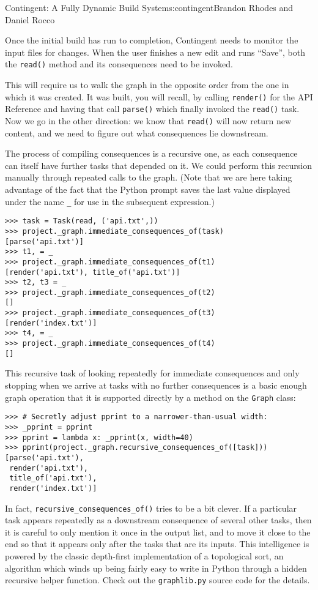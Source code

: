 \begin{aosachapter}{Contingent: A Fully Dynamic Build System}{s:contingent}{Brandon Rhodes and Daniel Rocco}
\label{chasing-consequences}

Once the initial build has run to completion, Contingent needs to
monitor the input files for changes. When the user finishes a new edit
and runs ``Save'', both the \texttt{read()} method and its consequences
need to be invoked.

This will require us to walk the graph in the opposite order from the
one in which it was created. It was built, you will recall, by calling
\texttt{render()} for the API Reference and having that call
\texttt{parse()} which finally invoked the \texttt{read()} task. Now we
go in the other direction: we know that \texttt{read()} will now return
new content, and we need to figure out what consequences lie downstream.

The process of compiling consequences is a recursive one, as each
consequence can itself have further tasks that depended on it. We could
perform this recursion manually through repeated calls to the graph.
(Note that we are here taking advantage of the fact that the Python
prompt saves the last value displayed under the name \texttt{\_} for use
in the subsequent expression.)

\begin{verbatim}
>>> task = Task(read, ('api.txt',))
>>> project._graph.immediate_consequences_of(task)
[parse('api.txt')]
>>> t1, = _
>>> project._graph.immediate_consequences_of(t1)
[render('api.txt'), title_of('api.txt')]
>>> t2, t3 = _
>>> project._graph.immediate_consequences_of(t2)
[]
>>> project._graph.immediate_consequences_of(t3)
[render('index.txt')]
>>> t4, = _
>>> project._graph.immediate_consequences_of(t4)
[]
\end{verbatim}

This recursive task of looking repeatedly for immediate consequences and
only stopping when we arrive at tasks with no further consequences is a
basic enough graph operation that it is supported directly by a method
on the \texttt{Graph} class:

\begin{verbatim}
>>> # Secretly adjust pprint to a narrower-than-usual width:
>>> _pprint = pprint
>>> pprint = lambda x: _pprint(x, width=40)
>>> pprint(project._graph.recursive_consequences_of([task]))
[parse('api.txt'),
 render('api.txt'),
 title_of('api.txt'),
 render('index.txt')]
\end{verbatim}

In fact, \texttt{recursive\_consequences\_of()} tries to be a bit
clever. If a particular task appears repeatedly as a downstream
consequence of several other tasks, then it is careful to only mention
it once in the output list, and to move it close to the end so that it
appears only after the tasks that are its inputs. This intelligence is
powered by the classic depth-first implementation of a topological sort,
an algorithm which winds up being fairly easy to write in Python through
a hidden recursive helper function. Check out the \texttt{graphlib.py}
source code for the details.


\end{aosachapter}
